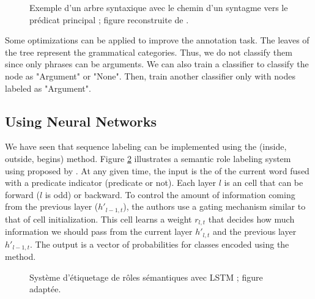 \documentclass{KBook}
\begin{document}
\begin{figure}[ht]
	\centering
	\caption[Exemple d'un arbre syntaxique avec le chemin vers le prédicat principal.]{Exemple d'un arbre syntaxique avec le chemin d'un syntagme vers le prédicat principal ; figure reconstruite de \cite{2019-jurafsky-martin}.}
	\label{fig:srl-arbre-chemin}
\end{figure}

Some optimizations can be applied to improve the annotation task. The leaves of the tree represent the grammatical categories. Thus, we do not classify them since only phrases can be arguments. We can also train a classifier to classify the node as "Argument" or "None". Then, train another classifier only with nodes labeled as "Argument".


\subsection{Using Neural Networks}

We have seen that sequence labeling can be implemented using the  (inside, outside, begins) method. Figure \ref{fig:srl-embedding} illustrates a semantic role labeling system using  proposed by \citet{2017-he-al}. At any given time, the input is the  of the current word fused with a predicate indicator (predicate or not). Each layer $l$ is an  cell that can be forward ($l$ is odd) or backward. To control the amount of information coming from the previous layer ($h'_{l-1, t}$), the authors use a gating mechanism similar to that of  cell initialization. This cell learns a weight $r_{l, t}$ that decides how much information we should pass from the current layer $h'_{l, t}$ and the previous layer $h'_{l-1, t}$. The output is a vector of probabilities for  classes encoded using the  method.


\begin{figure}[ht]
	\centering
	\caption[Système d'étiquetage de rôles sémantiques avec LSTM.]{Système d'étiquetage de rôles sémantiques avec LSTM \cite{2017-he-al} ; figure adaptée.}
	\label{fig:srl-embedding}
\end{figure}
\end{document}
